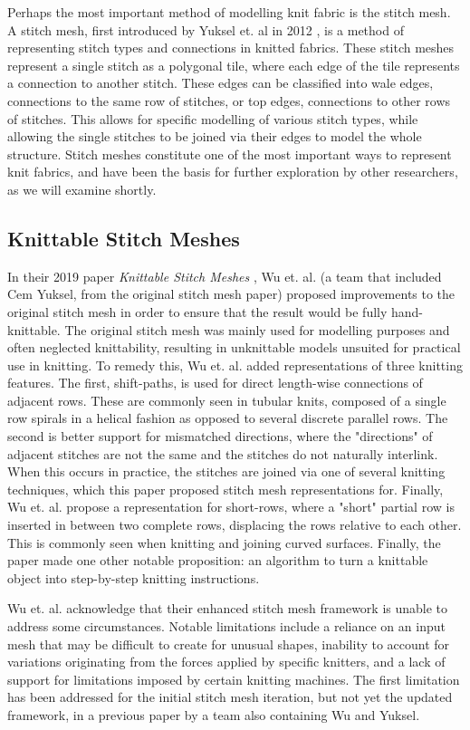 \documentclass{IEEEcsmag}
\begin{document}
Perhaps the most important method of modelling knit fabric is the stitch mesh. A stitch mesh, first introduced by Yuksel et. al in 2012 \cite{detail}, is a method of representing stitch types and connections in knitted fabrics. These stitch meshes represent a single stitch as a polygonal tile, where each edge of the tile represents a connection to another stitch. These edges can be classified into wale edges, connections to the same row of stitches, or top edges, connections to other rows of stitches. This allows for specific modelling of various stitch types, while allowing the single stitches to be joined via their edges to model the whole structure. Stitch meshes constitute one of the most important ways to represent knit fabrics, and have been the basis for further exploration by other researchers, as we will examine shortly.

\subsection{Knittable Stitch Meshes}

In their 2019 paper \textit{Knittable Stitch Meshes} \cite{knittable}, Wu et. al. (a team that included Cem Yuksel, from the original stitch mesh paper) proposed improvements to the original stitch mesh in order to ensure that the result would be fully hand-knittable. The original stitch mesh was mainly used for modelling purposes and often neglected knittability, resulting in unknittable models unsuited for practical use in knitting. To remedy this, Wu et. al. added representations of three knitting features. The first, shift-paths, is used for direct length-wise connections of adjacent rows. These are commonly seen in tubular knits, composed of a single row spirals in a helical fashion as opposed to several discrete parallel rows. The second is better support for mismatched directions, where the "directions" of adjacent stitches are not the same and the stitches do not naturally interlink. When this occurs in practice, the stitches are joined via one of several knitting techniques, which this paper proposed stitch mesh representations for. Finally, Wu et. al. propose a representation for short-rows, where a "short" partial row is inserted in between two complete rows, displacing the rows relative to each other. This is commonly seen when knitting and joining curved surfaces. Finally, the paper made one other notable proposition: an algorithm to turn a knittable object into step-by-step knitting instructions. 

Wu et. al. acknowledge that their enhanced stitch mesh framework is unable to address some circumstances. Notable limitations include a reliance on an input mesh that may be difficult to create for unusual shapes, inability to account for variations originating from the forces applied by specific knitters, and a lack of support for limitations imposed by certain knitting machines. The first limitation has been addressed for the initial stitch mesh iteration, but not yet the updated framework, in a previous paper by a team also containing Wu and Yuksel.
\end{document}

